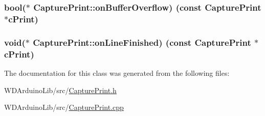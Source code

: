 \subsubsection[{on\+Buffer\+Overflow}]{\setlength{\rightskip}{0pt plus 5cm}bool($\ast$ Capture\+Print\+::on\+Buffer\+Overflow) (const {\bf Capture\+Print} $\ast$c\+Print)\hspace{0.3cm}{\ttfamily [protected]}}\label{class_capture_print_a601a9fdcb038b2e5d818083c58f5fff0}
\hypertarget{class_capture_print_a37eb0324e0edeaafb8d4e15118fef58f}{}
\subsubsection[{on\+Line\+Finished}]{\setlength{\rightskip}{0pt plus 5cm}void($\ast$ Capture\+Print\+::on\+Line\+Finished) (const {\bf Capture\+Print} $\ast$c\+Print)\hspace{0.3cm}{\ttfamily [protected]}}\label{class_capture_print_a37eb0324e0edeaafb8d4e15118fef58f}


The documentation for this class was generated from the following files\+:\begin{DoxyCompactItemize}
\item 
W\+D\+Arduino\+Lib/src/\hyperlink{_capture_print_8h}{Capture\+Print.\+h}\item 
W\+D\+Arduino\+Lib/src/\hyperlink{_capture_print_8cpp}{Capture\+Print.\+cpp}\end{DoxyCompactItemize}
